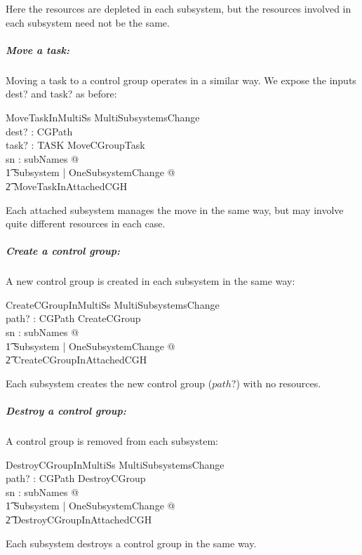 \documentclass[a4paper,twoside,12pt]{article}
\begin{document}
Here the resources are depleted in each subsystem, but the resources involved in each subsystem need not be the same.

\subparagraph{Move a task:}

Moving a task to a control group operates in a similar way.  We expose the inputs dest? and task? as before:
\begin{schema}{MoveTaskInMultiSs}
MultiSubsystemsChange \\
dest? : CGPath \\
task? : TASK
\where
MoveCGroupTask\\
\forall sn : subNames @ \\
\t1 \exists \Delta Subsystem | OneSubsystemChange @ \\
    \t2 MoveTaskInAttachedCGH
\end{schema}
Each attached subsystem manages the move in the same way, but may involve quite different resources in each case.

\subparagraph{Create a control group:}

A new control group is created in each subsystem in the same way:

\begin{schema}{CreateCGroupInMultiSs}
MultiSubsystemsChange \\
path? : CGPath
\where
CreateCGroup\\
\forall sn : subNames @ \\
\t1 \exists \Delta Subsystem | OneSubsystemChange @ \\
    \t2 CreateCGroupInAttachedCGH
\end{schema}
Each subsystem creates the new control group ($path?$) with no resources.

\subparagraph{Destroy a control group:}

A control group is removed from each subsystem:

\begin{schema}{DestroyCGroupInMultiSs}
MultiSubsystemsChange \\
path? : CGPath
\where
DestroyCGroup\\
\forall sn : subNames @ \\
\t1 \exists \Delta Subsystem | OneSubsystemChange @ \\
    \t2 DestroyCGroupInAttachedCGH
\end{schema}
Each subsystem destroys a control group in the same way.
\end{document}
